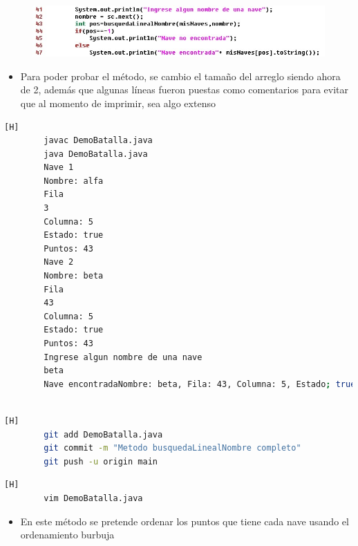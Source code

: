 \documentclass{article}
\begin{document}
	\begin{figure}[H]
		\centering
		\includegraphics[width=1\textwidth,keepaspectratio]{img/1.jpg}
	\end{figure}
		
	\begin{itemize}	
		\item Para poder probar el método, se cambio el tamaño del arreglo siendo ahora de 2, además que algunas líneas fueron puestas como comentarios para evitar que al momento de imprimir, sea algo extenso
	\end{itemize}
	
	\begin{lstlisting}[language=bash,caption={Probando el metodo busquedaLinealNombre}][H]	
		javac DemoBatalla.java
		java DemoBatalla.java
		Nave 1
		Nombre: alfa
		Fila
		3
		Columna: 5
		Estado: true
		Puntos: 43
		Nave 2
		Nombre: beta
		Fila
		43
		Columna: 5
		Estado: true
		Puntos: 43
		Ingrese algun nombre de una nave
		beta
		Nave encontradaNombre: beta, Fila: 43, Columna: 5, Estado; true, Puntos: 43
		
	\end{lstlisting}
	\begin{lstlisting}[language=bash,caption={Commit: Metodo busquedaLinealNombre completo}][H]
		git add DemoBatalla.java
		git commit -m "Metodo busquedaLinealNombre completo"			
		git push -u origin main
	\end{lstlisting}
	
	

	
	
	
	
	
	
	
	\begin{lstlisting}[language=bash,caption={Implementadno el método de ordenarPorPuntosBurbuja}][H]
		vim DemoBatalla.java
	\end{lstlisting}
	
	
	\begin{itemize}	
		\item En este método se pretende ordenar los puntos que tiene cada nave  usando el ordenamiento burbuja
	\end{itemize}	
	
\end{document}
